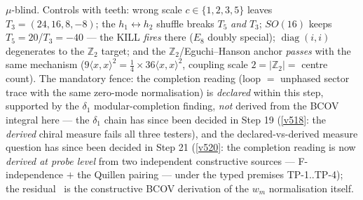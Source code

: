 \documentclass[11pt,a4paper]{article}
\newcommand{\Z}{\mathbb{Z}}
\theoremstyle{definition}
\begin{document}
$\mu$-blind. Controls with teeth: wrong scale $c\in\{1,2,3,5\}$ leaves $T_3=(24,16,8,-8)$; the
$h_1{\leftrightarrow}h_2$ shuffle breaks $T_5$ \emph{and} $T_3$; $SO(16)$ keeps
$T_5=20$/$T_3=-40$ --- the KILL \emph{fires} there ($E_8$ doubly special);
$\operatorname{diag}(i,i)$ degenerates to the $\Z_2$ target; and the $\Z_2$/Eguchi--Hanson
anchor \emph{passes} with the same mechanism ($9\langle x,x\rangle^2=\tfrac14\times36\langle
x,x\rangle^2$, coupling scale $2=|\Z_2|=$ centre count). The mandatory fence: the completion
reading (loop $=$ unphased sector trace with the same zero-mode normalisation) is
\emph{declared} within this step, supported by the $\delta_1$ modular-completion finding,
\emph{not} derived from
the BCOV integral here --- the $\delta_1$ chain has since been decided in Step 19 (\vref{v518}: the
\emph{derived} chiral measure fails all three testers), and the declared-vs-derived measure
question has since been decided in Step 21 (\vref{v520}: the completion reading is now
\emph{derived at probe level} from two independent constructive sources --- F-independence $+$
the Quillen pairing --- under the typed premises TP-1..TP-4); the residual \mO\ is the
constructive BCOV derivation of the $w_m$ normalisation itself.
\end{document}

